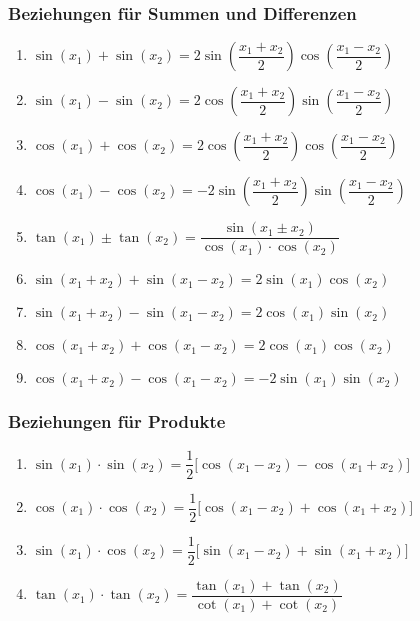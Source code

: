 \subsubsection{Beziehungen für Summen und Differenzen}
\begin{enumerate}[$(a)$] 
\item $\sin\left(x_1\right)+\sin\left(x_2\right)=2\sin\left(\dfrac{x_1+x_2}{2}\right)\cos\left(\dfrac{x_1-x_2}{2}\right)$
\item $\sin\left(x_1\right)-\sin\left(x_2\right)=2\cos\left(\dfrac{x_1+x_2}{2}\right)\sin\left(\dfrac{x_1-x_2}{2}\right)$
\item $\cos\left(x_1\right)+\cos\left(x_2\right)=2\cos\left(\dfrac{x_1+x_2}{2}\right)\cos\left(\dfrac{x_1-x_2}{2}\right)$
\item $\cos\left(x_1\right)-\cos\left(x_2\right)=-2\sin\left(\dfrac{x_1+x_2}{2}\right)\sin\left(\dfrac{x_1-x_2}{2}\right)$
\item $\tan\left(x_1\right)\pm \tan\left(x_2\right)=\dfrac{\sin\left(x_1\pm x_2\right)}{\cos\left(x_1\right)\cdot \cos\left(x_2\right)}$
\item $\sin\left(x_1+x_2\right)+\sin\left(x_1-x_2\right)=2\sin\left(x_1\right)\cos\left(x_2\right)$
\item $\sin\left(x_1+x_2\right)-\sin\left(x_1-x_2\right)=2\cos\left(x_1\right)\sin\left(x_2\right)$
\item $\cos\left(x_1+x_2\right)+\cos\left(x_1-x_2\right)=2\cos\left(x_1\right)\cos\left(x_2\right)$
\item $\cos\left(x_1+x_2\right)-\cos\left(x_1-x_2\right)=-2\sin\left(x_1\right)\sin\left(x_2\right)$
\end{enumerate}
\subsubsection{Beziehungen für Produkte}
\begin{enumerate}[$(a)$] 
\item $\sin\left(x_1\right)\cdot \sin\left(x_2\right)=\dfrac{1}{2}\Big[\cos\left(x_1-x_2\right)-\cos\left(x_1+x_2\right)\Big]$
\item $\cos\left(x_1\right)\cdot \cos\left(x_2\right)=\dfrac{1}{2}\Big[\cos\left(x_1-x_2\right)+\cos\left(x_1+x_2\right)\Big]$
\item $\sin\left(x_1\right)\cdot \cos\left(x_2\right)=\dfrac{1}{2}\Big[\sin\left(x_1-x_2\right)+\sin\left(x_1+x_2\right)\Big]$
\item $\tan\left(x_1\right)\cdot \tan\left(x_2\right)=\dfrac{\tan\left(x_1\right)+\tan\left(x_2\right)}{\cot\left(x_1\right)+\cot\left(x_2\right)}$
\end{enumerate}

